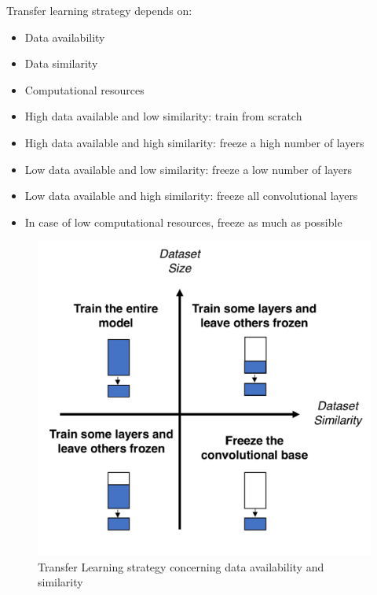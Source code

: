 \begin{paracol}{2}
   \colfill
   
   Transfer learning strategy depends on:
   \begin{itemize}
      \item Data availability
      \item Data similarity
      \item Computational resources
   \end{itemize}
   \nl
   
   \begin{itemize}
      \item High data available and low similarity: train from scratch
      \item High data available and high similarity: freeze a high number of layers
      \item Low data available and low similarity: freeze a low number of layers
      \item Low data available and high similarity: freeze all convolutional layers
      \item[]In case of low computational resources, freeze as much as possible
   \end{itemize}

   \colfill
   \switchcolumn

   \begin{figure}[htbp]
      \centering
      \includegraphics[width=0.9\columnwidth
      ]{images/10/transfer.png}
      \caption{Transfer Learning strategy concerning data availability and similarity}
      \label{fig:10/transfer}
   \end{figure}
\end{paracol}